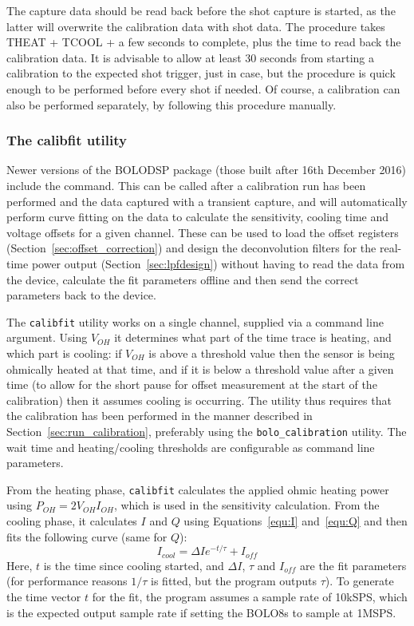 \documentclass[12pt,a4paper]{article}
\begin{document}
The capture data should be read back before the shot capture is started, as the latter will overwrite the calibration data with shot data. The procedure
takes THEAT + TCOOL + a few seconds to complete, plus the time to read back the calibration data. It is advisable to allow at least 30 seconds from
starting a calibration to the expected shot trigger, just in case, but the procedure is quick enough to be performed before every shot if needed. Of
course, a calibration can also be performed separately, by following this procedure manually.

\subsubsection{The calibfit utility}%
\label{sec:calibfit}
Newer versions of the BOLODSP package (those built after 16th December 2016) include the \mbox{} command. This can be
called after a calibration run has been performed and the data captured with a transient capture, and will automatically perform curve fitting on the
data to calculate the sensitivity, cooling time and voltage offsets for a given channel. These can be used to load the offset registers
(Section~\ref{sec:offset_correction}) and design the deconvolution filters for the real-time power output (Section~\ref{sec:lpfdesign}) without having
to read the data from the device, calculate the fit parameters offline and then send the correct parameters back to the device.

The \texttt{calibfit} utility works on a single channel, supplied via a command line argument. Using $V_{OH}$ it determines what part of the time trace
is heating, and which part is cooling: if $V_{OH}$ is above a threshold value then the sensor is being ohmically heated at that time, and if it is
below a threshold value after a given time (to allow for the short pause for offset measurement at the start of the calibration) then it assumes
cooling is occurring. The utility thus requires that the calibration has been performed in the manner described in Section~\ref{sec:run_calibration},
preferably using the \texttt{bolo\_calibration} utility. The wait time and heating/cooling thresholds are configurable as command line parameters.

From the heating phase, \texttt{calibfit} calculates the applied ohmic heating power using $P_{OH} = 2 V_{OH} I_{OH}$, which is used in the sensitivity
calculation. From the cooling phase, it calculates $I$ and $Q$ using Equations~\ref{equ:I} and~\ref{equ:Q} and then fits the following curve (same
for $Q$):
\begin{equation}
  \label{equ:Icool}
  I_{cool} = \Delta I e^{-t / \tau} + I_{off}
\end{equation}
Here, $t$ is the time since cooling started, and $\Delta I$, $\tau$ and $I_{off}$ are the fit parameters (for performance reasons $1/\tau$ is fitted,
but the program outputs $\tau$). To generate the time vector $t$ for the fit, the program assumes a sample rate of 10kSPS, which is the expected output
sample rate if setting the BOLO8s to sample at 1MSPS\@.
\end{document}
